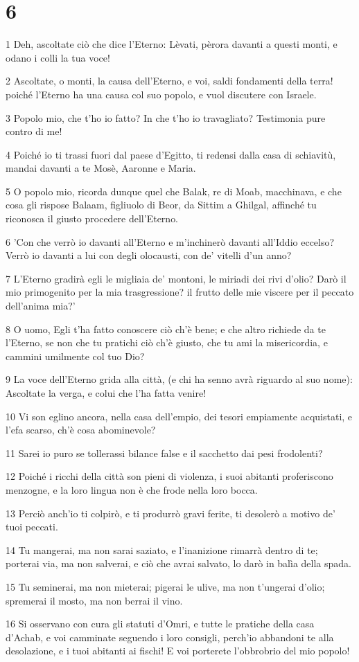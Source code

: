\chapter{6}

\par 1 Deh, ascoltate ciò che dice l'Eterno: Lèvati, pèrora davanti a questi monti, e odano i colli la tua voce!
\par 2 Ascoltate, o monti, la causa dell'Eterno, e voi, saldi fondamenti della terra! poiché l'Eterno ha una causa col suo popolo, e vuol discutere con Israele.
\par 3 Popolo mio, che t'ho io fatto? In che t'ho io travagliato? Testimonia pure contro di me!
\par 4 Poiché io ti trassi fuori dal paese d'Egitto, ti redensi dalla casa di schiavitù, mandai davanti a te Mosè, Aaronne e Maria.
\par 5 O popolo mio, ricorda dunque quel che Balak, re di Moab, macchinava, e che cosa gli rispose Balaam, figliuolo di Beor, da Sittim a Ghilgal, affinché tu riconosca il giusto procedere dell'Eterno.
\par 6 'Con che verrò io davanti all'Eterno e m'inchinerò davanti all'Iddio eccelso? Verrò io davanti a lui con degli olocausti, con de' vitelli d'un anno?
\par 7 L'Eterno gradirà egli le migliaia de' montoni, le miriadi dei rivi d'olio? Darò il mio primogenito per la mia trasgressione? il frutto delle mie viscere per il peccato dell'anima mia?'
\par 8 O uomo, Egli t'ha fatto conoscere ciò ch'è bene; e che altro richiede da te l'Eterno, se non che tu pratichi ciò ch'è giusto, che tu ami la misericordia, e cammini umilmente col tuo Dio?
\par 9 La voce dell'Eterno grida alla città, (e chi ha senno avrà riguardo al suo nome): Ascoltate la verga, e colui che l'ha fatta venire!
\par 10 Vi son eglino ancora, nella casa dell'empio, dei tesori empiamente acquistati, e l'efa scarso, ch'è cosa abominevole?
\par 11 Sarei io puro se tollerassi bilance false e il sacchetto dai pesi frodolenti?
\par 12 Poiché i ricchi della città son pieni di violenza, i suoi abitanti proferiscono menzogne, e la loro lingua non è che frode nella loro bocca.
\par 13 Perciò anch'io ti colpirò, e ti produrrò gravi ferite, ti desolerò a motivo de' tuoi peccati.
\par 14 Tu mangerai, ma non sarai saziato, e l'inanizione rimarrà dentro di te; porterai via, ma non salverai, e ciò che avrai salvato, lo darò in balìa della spada.
\par 15 Tu seminerai, ma non mieterai; pigerai le ulive, ma non t'ungerai d'olio; spremerai il mosto, ma non berrai il vino.
\par 16 Si osservano con cura gli statuti d'Omri, e tutte le pratiche della casa d'Achab, e voi camminate seguendo i loro consigli, perch'io abbandoni te alla desolazione, e i tuoi abitanti ai fischi! E voi porterete l'obbrobrio del mio popolo!

